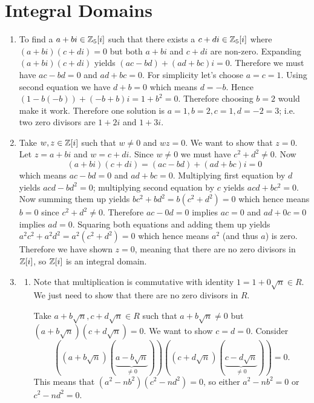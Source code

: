 \section{Integral Domains}
\begin{enumerate}
    \item To find a $a+bi \in \mathbb{Z}_5[i]$ such that there exists a $c+di \in \mathbb{Z}_5[i]$ where $(a+bi)(c+di) = 0$ but both $a+bi$ and $c+di$ are non-zero. Expanding $(a+bi)(c+di)$ yields $(ac-bd)+(ad+bc)i = 0$. Therefore we must have $ac-bd = 0$ and $ad+bc = 0$. For simplicity let's choose $a=c=1$. Using second equation we have $d+b = 0$ which means $d = -b$. Hence $(1 - b(-b))+(-b + b)i = 1+b^2 = 0$. Therefore choosing $b = 2$ would make it work. Therefore one solution is $a = 1, b = 2, c = 1, d = -2 = 3$; i.e. two zero divisors are $1+2i$ and $1+3i$.
    
    \item Take $w, z \in \mathbb{Z}[i]$ such that $w \neq 0$ and $wz = 0$. We want to show that $z = 0$. Let $z = a+bi$ and $w = c+di$. Since $w \neq 0$ we must have $c^2+d^2 \neq 0$. Now
    \[
        (a+bi)(c+di) = (ac-bd)+(ad+bc)i = 0
    \]
    which means $ac - bd = 0$ and $ad+bc = 0$. Multiplying first equation by $d$ yields $acd - bd^2 = 0$; multiplying second equation by $c$ yields $acd + bc^2 = 0$. Now summing them up yields $bc^2+bd^2 = b(c^2+d^2) = 0$ which hence means $b = 0$ since $c^2+d^2 \neq 0$. Therefore $ac - 0d = 0$ implies $ac = 0$ and $ad+0c = 0$ implies $ad = 0$. Squaring both equations and adding them up yields $a^2c^2 + a^2d^2 = a^2(c^2+d^2) = 0$ which hence means $a^2$ (and thus $a$) is zero. Therefore we have shown $z = 0$, meaning that there are no zero divisors in $\mathbb{Z}[i]$, so $\mathbb{Z}[i]$ is an integral domain.

    \item \begin{enumerate}[label=(\alph*)]
        \item Note that multiplication is commutative with identity $1 = 1 + 0\sqrt{n} \in R$. We just need to show that there are no zero divisors in $R$.
        
        Take $a+b\sqrt n, c+d\sqrt n \in R$ such that $a+b\sqrt n \neq 0$ but $(a+b\sqrt n)(c+d\sqrt n) = 0$. We want to show $c = d = 0$. Consider
        \[
            \left((a+b\sqrt n)(\underbrace{a-b\sqrt n}_{\neq 0})\right)\left((c+d\sqrt n)(\underbrace{c-d\sqrt n}_{\neq 0})\right) = 0.
        \]
        This means that $(a^2-nb^2)(c^2-nd^2) = 0$, so either $a^2-nb^2 = 0$ or $c^2-nd^2 = 0$.


\end{enumerate}
\end{enumerate}
